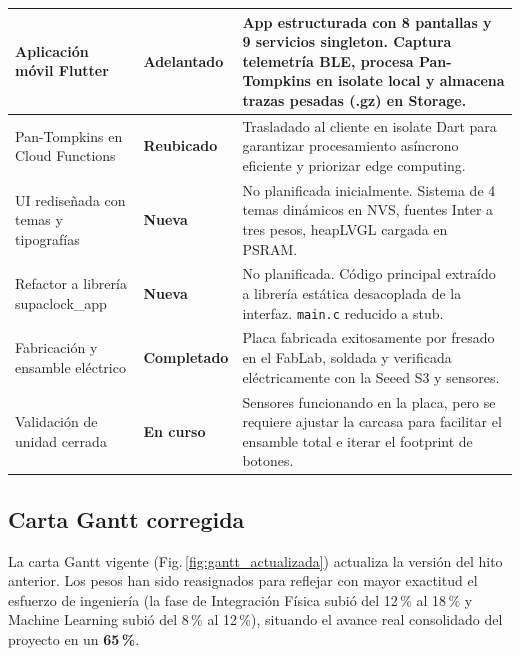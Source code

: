 \documentclass[letterpaper,11pt]{article}
\newcommand{\rfigura}[1]{Fig.\,\ref{#1}}
\begin{document}
\begin{longtable}{|L{4.0cm}|L{2.4cm}|L{8.0cm}|}
Aplicación móvil Flutter & \bf Adelantado & App estructurada con 8 pantallas y 9 servicios singleton. Captura telemetría BLE, procesa Pan-Tompkins en isolate local y almacena trazas pesadas (.gz) en Storage. \\ \hline
Pan-Tompkins en Cloud Functions & \bf Reubicado & Trasladado al cliente en isolate Dart para garantizar procesamiento asíncrono eficiente y priorizar edge computing. \\ \hline
UI rediseñada con temas y tipografías & \bf Nueva & No planificada inicialmente. Sistema de 4 temas dinámicos en NVS, fuentes Inter a tres pesos, heapLVGL cargada en PSRAM. \\ \hline
Refactor a librería supaclock\_app & \bf Nueva & No planificada. Código principal extraído a librería estática desacoplada de la interfaz. \texttt{main.c} reducido a stub. \\ \hline
Fabricación y ensamble eléctrico & \bf Completado & Placa fabricada exitosamente por fresado en el FabLab, soldada y verificada eléctricamente con la Seeed S3 y sensores. \\ \hline
Validación de unidad cerrada & \bf En curso & Sensores funcionando en la placa, pero se requiere ajustar la carcasa para facilitar el ensamble total e iterar el footprint de botones. \\ \hline
\end{longtable}

\subsection{Carta Gantt corregida}

La carta Gantt vigente (\rfigura{fig:gantt_actualizada}) actualiza la versión del hito anterior. Los pesos han sido reasignados para reflejar con mayor exactitud el esfuerzo de ingeniería (la fase de Integración Física subió del 12\,\% al 18\,\% y Machine Learning subió del 8\,\% al 12\,\%), situando el avance real consolidado del proyecto en un \textbf{65\,\%}.
\end{document}
